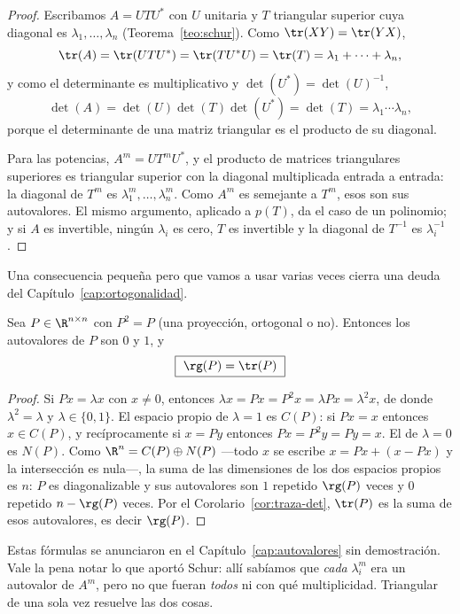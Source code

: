 \begin{proof}
Escribamos $A=UTU^{*}$ con $U$ unitaria y $T$ triangular superior cuya diagonal
es $\lambda_1,\dots,\lambda_n$ (Teorema~\ref{teo:schur}). Como
$\tr(XY)=\tr(YX)$,
\[
\tr(A)=\tr(UTU^{*})=\tr(TU^{*}U)
=\tr(T)=\lambda_1+\cdots+\lambda_n ,
\]
y como el determinante es multiplicativo y $\det(U^{*})=\det(U)^{-1}$,
\[
\det(A)=\det(U)\det(T)\det(U^{*})=\det(T)=\lambda_1\cdots\lambda_n ,
\]
porque el determinante de una matriz triangular es el producto de su diagonal.

Para las potencias, $A^{m}=UT^{m}U^{*}$, y el producto de matrices triangulares
superiores es triangular superior con la diagonal multiplicada entrada a entrada:
la diagonal de $T^{m}$ es $\lambda_1^{m},\dots,\lambda_n^{m}$. Como $A^{m}$ es
semejante a $T^{m}$, esos son sus autovalores. El mismo argumento, aplicado a
$p(T)$, da el caso de un polinomio; y si $A$ es invertible, ningún $\lambda_i$ es
cero, $T$ es invertible y la diagonal de $T^{-1}$ es $\lambda_i^{-1}$.
\end{proof}

Una consecuencia pequeña pero que vamos a usar varias veces cierra una deuda
del Capítulo~\ref{cap:ortogonalidad}.

\begin{corollary}\label{cor:traza-proyeccion}
Sea $P\in\R^{n\times n}$ con $P^2=P$ (una proyección, ortogonal o no).
Entonces los autovalores de $P$ son $0$ y $1$, y
\[
\boxed{\ \rg(P)=\tr(P)\ }
\]
\end{corollary}

\begin{proof}
Si $Px=\lambda x$ con $x\neq0$, entonces
$\lambda x = Px = P^2x = \lambda Px=\lambda^2x$, de donde
$\lambda^2=\lambda$ y $\lambda\in\{0,1\}$. El espacio propio de $\lambda=1$ es
$C(P)$: si $Px=x$ entonces $x\in C(P)$, y recíprocamente si $x=Py$ entonces
$Px=P^2y=Py=x$. El de $\lambda=0$ es $N(P)$. Como
$\R^n=C(P)\oplus N(P)$ ---todo $x$ se escribe $x=Px+(x-Px)$ y la
intersección es nula---, la suma de las dimensiones de los dos espacios
propios es $n$: $P$ es diagonalizable y sus autovalores son $1$ repetido
$\rg(P)$ veces y $0$ repetido $n-\rg(P)$ veces. Por el
Corolario~\ref{cor:traza-det}, $\tr(P)$ es la suma de esos autovalores, es
decir $\rg(P)$.
\end{proof}

\begin{remark}
Estas fórmulas se anunciaron en el Capítulo~\ref{cap:autovalores} sin demostración.
Vale la pena notar lo que aportó Schur: allí sabíamos que \emph{cada} $\lambda_i^{m}$
era un autovalor de $A^{m}$, pero no que fueran \emph{todos} ni con qué multiplicidad.
Triangular de una sola vez resuelve las dos cosas.
\end{remark}


